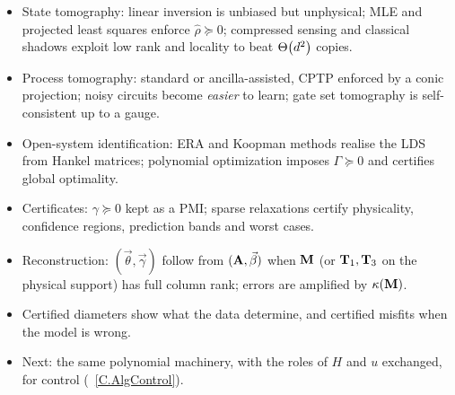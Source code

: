 \documentclass[handoutsbeamer.tex]{subfiles}
\begin{document}
\begin{frame}\mop{\footnotesize}
\begin{itemize}\setlength\itemsep{0.25em}
    \item State tomography: linear inversion is unbiased but unphysical; MLE and projected least squares enforce $\hat\rho\succeq0$; compressed sensing and classical shadows exploit low rank and locality to beat $\Theta\!\left(d^2\right)$ copies.
    \item Process tomography: standard or ancilla-assisted, CPTP enforced by a conic projection; noisy circuits become \emph{easier} to learn; gate set tomography is self-consistent up to a gauge.
    \item Open-system identification: ERA and Koopman methods realise the LDS from Hankel matrices; polynomial optimization imposes $\Gamma\succeq0$ and certifies global optimality.
    \item Certificates: $\gamma\succeq0$ kept as a PMI; sparse relaxations certify physicality, confidence regions, prediction bands and worst cases.
    \item Reconstruction: $(\vec\theta,\vec\gamma)$ follow from $(\mathbf{A},\vec\beta)$ when $\mathbf{M}$ (or $\mathbf{T}_1,\mathbf{T}_3$ on the physical support) has full column rank; errors are amplified by $\kappa(\mathbf{M})$.
    \item Certified diameters show what the data determine, and certified misfits when the model is wrong.
    \item Next: the same polynomial machinery, with the roles of $H$ and $u$ exchanged, for control (\Chap~\ref{C.AlgControl}).
\end{itemize}
\end{frame}

\biblio
\end{document}
